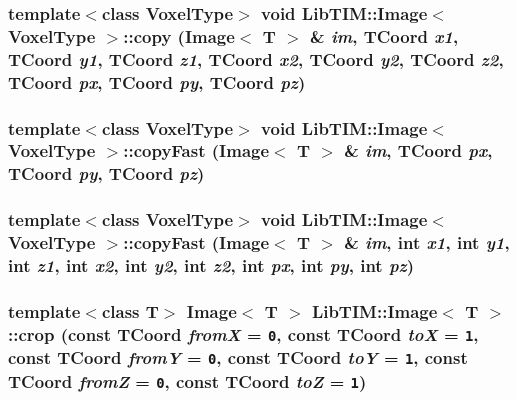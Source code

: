 \subsubsection{\setlength{\rightskip}{0pt plus 5cm}template$<$class Voxel\-Type$>$ void {\bf Lib\-TIM::Image}$<$ Voxel\-Type $>$::copy ({\bf Image}$<$ T $>$ \& {\em im}, {\bf TCoord} {\em x1}, {\bf TCoord} {\em y1}, {\bf TCoord} {\em z1}, {\bf TCoord} {\em x2}, {\bf TCoord} {\em y2}, {\bf TCoord} {\em z2}, {\bf TCoord} {\em px}, {\bf TCoord} {\em py}, {\bf TCoord} {\em pz})\hspace{0.3cm}{\tt  [inherited]}}\label{group__Image_ga60}


\subsubsection{\setlength{\rightskip}{0pt plus 5cm}template$<$class Voxel\-Type$>$ void {\bf Lib\-TIM::Image}$<$ Voxel\-Type $>$::copy\-Fast ({\bf Image}$<$ T $>$ \& {\em im}, {\bf TCoord} {\em px}, {\bf TCoord} {\em py}, {\bf TCoord} {\em pz})\hspace{0.3cm}{\tt  [inherited]}}\label{group__Image_ga62}


\subsubsection{\setlength{\rightskip}{0pt plus 5cm}template$<$class Voxel\-Type$>$ void {\bf Lib\-TIM::Image}$<$ Voxel\-Type $>$::copy\-Fast ({\bf Image}$<$ T $>$ \& {\em im}, int {\em x1}, int {\em y1}, int {\em z1}, int {\em x2}, int {\em y2}, int {\em z2}, int {\em px}, int {\em py}, int {\em pz})\hspace{0.3cm}{\tt  [inherited]}}\label{group__Image_ga61}


\subsubsection{\setlength{\rightskip}{0pt plus 5cm}template$<$class T$>$ Image$<$ T $>$ {\bf Lib\-TIM::Image}$<$ T $>$::crop (const {\bf TCoord} {\em from\-X} = {\tt 0}, const {\bf TCoord} {\em to\-X} = {\tt 1}, const {\bf TCoord} {\em from\-Y} = {\tt 0}, const {\bf TCoord} {\em to\-Y} = {\tt 1}, const {\bf TCoord} {\em from\-Z} = {\tt 0}, const {\bf TCoord} {\em to\-Z} = {\tt 1})\hspace{0.3cm}{\tt  [inherited]}}\label{group__Image_ga59}


